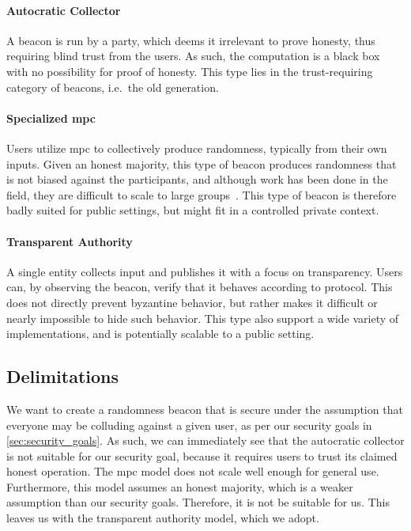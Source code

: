 \paragraph{Autocratic Collector}
A beacon is run by a party, which deems it irrelevant to prove honesty, thus requiring blind trust from the users.
As such, the computation is a black box with no possibility for proof of honesty.
This type lies in the trust-requiring category of beacons, i.e.\ the old generation.

\paragraph{Specialized \acrshort{mpc}}
Users utilize \acrfull{mpc} to collectively produce randomness, typically from their own inputs.
Given an honest majority, this type of beacon produces randomness that is not biased against the participants, and although work has been done in the field, they are difficult to scale to large groups~\cite{cascudo2017scrape, syta2017scalable}.
This type of beacon is therefore badly suited for public settings, but might fit in a controlled private context.

\paragraph{Transparent Authority}
A single entity collects input and publishes it with a focus on transparency.
Users can, by observing the beacon, verify that it behaves according to protocol.
This does not directly prevent byzantine behavior, but rather makes it difficult or nearly impossible to hide such behavior.
This type also support a wide variety of implementations, and is potentially scalable to a public setting.

\subsection{Delimitations}%
\label{sub:delimitations}
We want to create a randomness beacon that is secure under the assumption that everyone may be colluding against a given user, as per our security goals in \cref{sec:security_goals}.
As such, we can immediately see that the autocratic collector is not suitable for our security goal, because it requires users to trust its claimed honest operation.
The \gls{mpc} model does not scale well enough for general use.
Furthermore, this model assumes an honest majority, which is a weaker assumption than our security goals.
Therefore, it is not be suitable for us. This leaves us with the transparent authority model, which we adopt.

